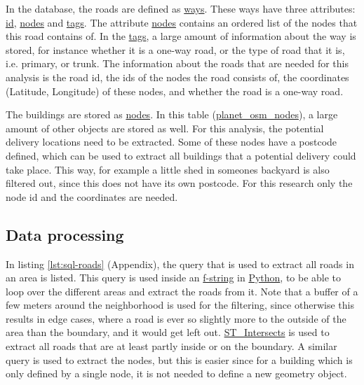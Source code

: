 \documentclass[12pt]{article}
\numberwithin{equation}{section}
\newcommand{\1}[1]{\,I_{#1}} %
\begin{document}
In the database, the roads are defined as \url{ways}. These ways have three
attributes: \url{id}, \url{nodes} and \url{tags}. The attribute \url{nodes} contains an ordered list
of the nodes that this road contains of.
In the \url{tags}, a large amount of 
information about the way is stored, for instance whether it is a 
one-way road, or the type of road that it is, i.e. primary, or trunk.
The information about the roads that are needed for this analysis is the
road id, the ids of the nodes the road consists of, the coordinates
(Latitude, Longitude) of these nodes, and whether the road is a one-way
road.

The buildings are stored as \url{nodes}. In this table (\url{planet_osm_nodes}),
a large amount of other objects are stored as well. For this analysis,
the potential delivery locations need to be extracted. Some of these 
nodes have a postcode defined, which can be used to extract all buildings
that a potential delivery could take place. This way, for example a little shed in 
someones backyard is also filtered out, since this does not have its own 
postcode. For this research only the node id and the coordinates are
needed.

\subsection{Data processing}
In listing \ref{lst:sql-roads} (Appendix), the query that is used to extract
all roads in an area is listed. This query is used inside an \url{f-string}
in \url{Python}, to be able to loop over the different areas and extract
the roads from it. Note that a buffer of a few meters around the neighborhood
is used for the filtering, since otherwise this results in edge cases,
where a road is ever so slightly more to the outside of the area than the boundary,
and it would get left out. \url{ST_Intersects} is used to extract all roads
that are at least partly inside or on the boundary. A similar query is used 
to extract the nodes, but this is easier since for a building which is only
defined by a single node, it is not needed to define a new geometry object.
\end{document}
